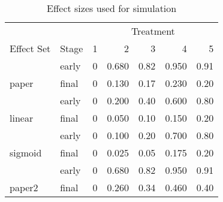 \begin{table}

\caption{\label{tab:table_effect_names}Effect sizes used for simulation}
\centering
\begin{tabular}[t]{llrrrrr}
\toprule
\multicolumn{2}{c}{ } & \multicolumn{5}{c}{Treatment} \\
\cmidrule(l{3pt}r{3pt}){3-7}
Effect Set & Stage & 1 & 2 & 3 & 4 & 5\\
\midrule
 & early & 0 & 0.680 & 0.82 & 0.950 & 0.91\\

\multirow{-2}{*}{\raggedright\arraybackslash paper} & final & 0 & 0.130 & 0.17 & 0.230 & 0.20\\
\cmidrule{1-7}
 & early & 0 & 0.200 & 0.40 & 0.600 & 0.80\\

\multirow{-2}{*}{\raggedright\arraybackslash linear} & final & 0 & 0.050 & 0.10 & 0.150 & 0.20\\
\cmidrule{1-7}
 & early & 0 & 0.100 & 0.20 & 0.700 & 0.80\\

\multirow{-2}{*}{\raggedright\arraybackslash sigmoid} & final & 0 & 0.025 & 0.05 & 0.175 & 0.20\\
\cmidrule{1-7}
 & early & 0 & 0.680 & 0.82 & 0.950 & 0.91\\

\multirow{-2}{*}{\raggedright\arraybackslash paper2} & final & 0 & 0.260 & 0.34 & 0.460 & 0.40\\
\bottomrule
\end{tabular}
\end{table}
